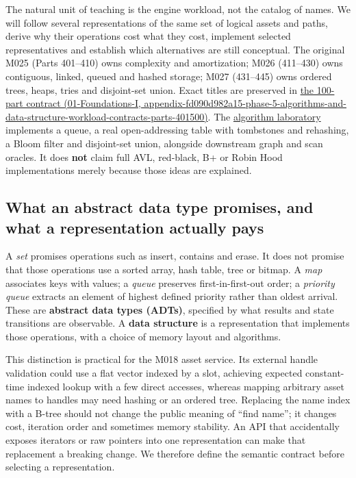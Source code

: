 The natural unit of teaching is the engine workload, not the catalog of names. We will follow several representations of the same set of logical assets and paths, derive why their operations cost what they cost, implement selected representatives and establish which alternatives are still conceptual. The original M025 (Parts 401--410) owns complexity and amortization; M026 (411--430) owns contiguous, linked, queued and hashed storage; M027 (431--445) owns ordered trees, heaps, tries and disjoint-set union. Exact titles are preserved in \href{../01-Foundations-I/main.pdf\#nameddest=appendix-fd090d982a15-phase-5-algorithms-and-data-structure-workload-contracts-parts-401500}{the 100-part contract (01-Foundations-I, appendix-fd090d982a15-phase-5-algorithms-and-data-structure-workload-contracts-parts-401500)}. The \hyperref[source-file-0ec69e1a1a11439bca29faa5]{algorithm laboratory} implements a queue, a real open-addressing table with tombstones and rehashing, a Bloom filter and disjoint-set union, alongside downstream graph and scan oracles. It does \textbf{not} claim full AVL, red-black, B+ or Robin Hood implementations merely because those ideas are explained.

\subsection{What an abstract data type promises, and what a representation actually pays}\label{05-engine-i-ch007-what-an-abstract-data-type-promises-and-what-a-representation-actually-pays}

A \emph{set} promises operations such as insert, contains and erase. It does not promise that those operations use a sorted array, hash table, tree or bitmap. A \emph{map} associates keys with values; a \emph{queue} preserves first-in-first-out order; a \emph{priority queue} extracts an element of highest defined priority rather than oldest arrival. These are \textbf{abstract data types (ADTs)}, specified by what results and state transitions are observable. A \textbf{data structure} is a representation that implements those operations, with a choice of memory layout and algorithms.

This distinction is practical for the M018 asset service. Its external handle validation could use a flat vector indexed by a slot, achieving expected constant-time indexed lookup with a few direct accesses, whereas mapping arbitrary asset names to handles may need hashing or an ordered tree. Replacing the name index with a B-tree should not change the public meaning of ``find name''; it changes cost, iteration order and sometimes memory stability. An API that accidentally exposes iterators or raw pointers into one representation can make that replacement a breaking change. We therefore define the semantic contract before selecting a representation.

